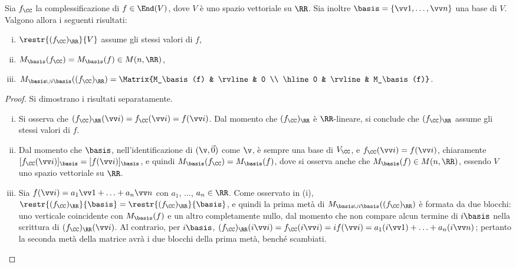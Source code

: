 \begin{proposition}
	Sia $f_\CC$ la complessificazione di $f \in \End(V)$, dove $V$ è uno spazio vettoriale su $\RR$.
	Sia inoltre $\basis = \{ \vv 1, \ldots, \vv n \}$ una base di $V$. Valgono allora i seguenti risultati:
	
	\begin{enumerate}[(i)]
		\item $\restr{(f_\CC)_\RR}{V}$ assume gli stessi valori di $f$,
		\item $M_\basis(f_\CC) = M_\basis(f) \in M(n, \RR)$,
		\item $M_{\basis \cup i \basis}((f_\CC)_\RR) = \Matrix{M_\basis(f) & \rvline & 0 \\ \hline 0 & \rvline & M_\basis(f)}$.
	\end{enumerate}
\end{proposition}

\begin{proof}Si dimostrano i risultati separatamente.
	\begin{enumerate}[(i)]
		\item Si osserva che $(f_\CC)_\RR(\vv i) = f_\CC(\vv i) = f(\vv i)$. Dal momento che
		$(f_\CC)_\RR$ è $\RR$-lineare, si conclude che $(f_\CC)_\RR$ assume gli stessi valori
		di $f$.
		
		\item Dal momento che $\basis$, nell'identificazione di $(\v, \vec 0)$ come $\v$, è
		sempre una base di $V_\CC$, e $f_\CC(\vv i) = f(\vv i)$, chiaramente
		$[f_\CC(\vv i)]_\basis = [f(\vv i)]_\basis$, e quindi $M_\basis(f_\CC) = M_\basis(f)$,
		dove si osserva anche che $M_\basis(f) \in M(n, \RR)$, essendo $V$ uno spazio vettoriale
		su $\RR$.
		
		\item Sia $f(\vv i) = a_1 \vv 1 + \ldots + a_n \vv n$ con $a_1$, ..., $a_n \in \RR$. Come
		osservato in (i), $\restr{(f_\CC)_\RR}{\basis} = \restr{(f_\CC)_\RR}{\basis}$, e quindi
		la prima metà di $M_{\basis \cup i \basis}((f_\CC)_\RR)$ è formata da due blocchi: uno
		verticale coincidente con $M_\basis(f)$ e un altro completamente nullo, dal momento che
		non compare alcun termine di $i \basis$ nella scrittura di $(f_\CC)_\RR(\vv i)$. Al
		contrario, per $i \basis$, $(f_\CC)_\RR(i \vv i) = f_\CC(i \vv i) = i f(\vv i) = a_1 (i \vv 1) +
		\ldots + a_n (i \vv n)$; pertanto la seconda metà della matrice avrà i due blocchi della prima metà,
		benché scambiati.
	\end{enumerate}
\end{proof}

